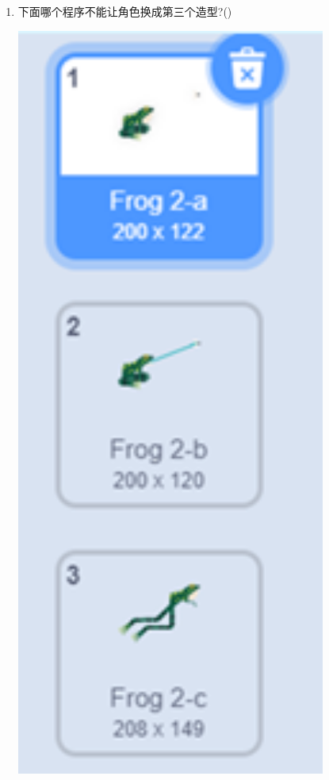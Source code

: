 \documentclass[10pt, a4paper]{article}
\begin{document}
\begin{enumerate}
        \item 下面哪个程序不能让角色换成第三个造型?(\qquad)
        
        \begin{minipage}{.1\textwidth}
            \centering
            \includegraphics[width=0.8\textwidth]{15.png}

\end{minipage}
\end{enumerate}
\end{document}

